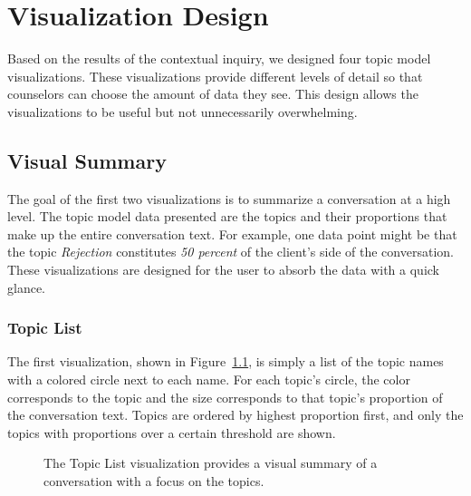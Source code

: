 \chapter{Visualization Design}

Based on the results of the contextual inquiry, we designed four topic model
visualizations. These visualizations provide different levels of detail so that counselors can
choose the amount of data they see. This design allows the visualizations to be useful
but not unnecessarily overwhelming.

\section{Visual Summary}

The goal of the first two visualizations is to summarize a conversation at a high
level. The topic model data presented are the topics and their proportions that make
up the entire conversation text. For example, one data point might be that the
topic \textit{Rejection} constitutes \textit{50 percent} of the client's side of the conversation. These
visualizations are designed for the user to absorb the data with a quick glance.

\subsection{Topic List}

The first visualization, shown in Figure~\ref{topiclist}, is simply a list of the topic names with
a colored circle next to each name. For each topic's circle, the color corresponds to
the topic and the size corresponds to that topic's proportion of the conversation text.
Topics are ordered by highest proportion first, and only the topics with proportions
over a certain threshold are shown.

\begin{figure}[h]
  \centering
  \caption{The Topic List visualization provides a visual summary of a conversation
  with a focus on the topics.}
  \label{topiclist}
\end{figure}

